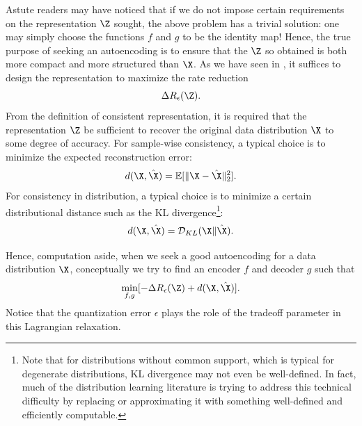 \documentclass[../../book-main.tex]{subfiles}
\begin{document}
Astute readers may have noticed that if we do not impose certain
requirements on the representation $\Z$ sought, the above problem has
a trivial solution: one may simply choose the functions $f$ and $g$
to be the identity map! Hence, the true purpose of seeking an
autoencoding is to ensure that the $\Z$ so obtained is both more
compact and more structured than $\X$.
As we have seen in ,
it suffices to design the representation to maximize the rate reduction
\begin{equation}
    \Delta R_{\epsilon}(\Z).
\end{equation}%
From the definition of consistent representation, it is required that
the representation $\Z$ be sufficient to recover the original data
distribution $\X$ to some degree of accuracy. For sample-wise
consistency, a typical choice is to minimize the expected reconstruction error:
\begin{equation}
    d(\X, \hat \X) = \mathbb{E}[\|\X - \hat\X\|_2^2].
\end{equation}
For consistency in distribution, a typical choice is to minimize a
certain distributional distance such as the KL
divergence\footnote{Note that for distributions without common
    support, which is typical for degenerate distributions, KL divergence
    may not even be well-defined. In fact, much of the distribution
    learning literature is trying to address this technical difficulty by
    replacing or approximating it with something well-defined and
efficiently computable.}:
\begin{equation}
    d(\X, \hat \X) = \mathcal{D}_{KL}(\X\|\hat\X).
\end{equation}

Hence, computation aside, when we seek a good autoencoding for a data
distribution $\X$, conceptually we try to find an encoder $f$ and
decoder $g$ such that
\begin{equation}
    \min_{f, g} [- \Delta R_{\epsilon}(\Z) + d(\X, \hat \X)].
    \label{eqn:autoencode-objective-ch5}
\end{equation}
Notice that the quantization error $\epsilon$ plays the role of the tradeoff
parameter in this Lagrangian relaxation.
\end{document}
